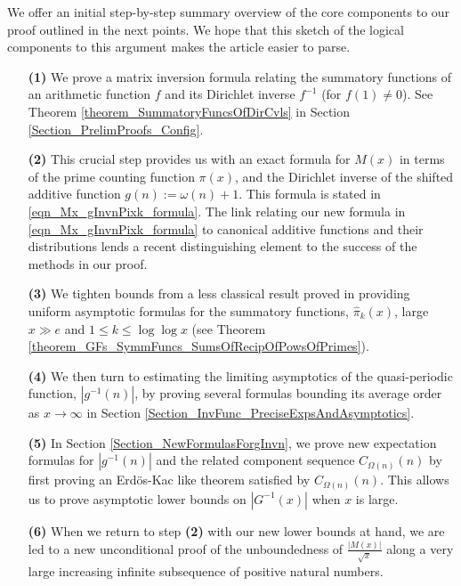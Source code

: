 \documentclass[11pt,reqno,a4letter]{article}
\numberwithin{figure}{section}
\numberwithin{table}{section}
\theoremstyle{plain}
\numberwithin{theorem}{section}
\theoremstyle{definition}
\begin{document}
We offer an initial step-by-step summary overview of the core components 
to our proof outlined in the next points. 
We hope that this sketch of the logical components 
to this argument makes the article easier to parse. 
\begin{itemize} 

\item[\textbf{(1)}] We prove a matrix inversion formula relating the summatory 
           functions of an arithmetic function $f$ and its Dirichlet inverse $f^{-1}$ (for $f(1) \neq 0$). 
           See Theorem \ref{theorem_SummatoryFuncsOfDirCvls} in 
           Section \ref{Section_PrelimProofs_Config}.  
\item[\textbf{(2)}] This crucial step provides us with an exact formula for $M(x)$ in terms of 
           the prime counting function $\pi(x)$, and the 
           Dirichlet inverse of the shifted additive function $g(n) := \omega(n) + 1$. This 
           formula is stated in \eqref{eqn_Mx_gInvnPixk_formula}. 
           The link relating our new formula in 
           \eqref{eqn_Mx_gInvnPixk_formula} to canonical additive functions and their 
           distributions lends a recent distinguishing element to the 
           success of the methods in our proof. 
\item[\textbf{(3)}] We tighten bounds from a less classical result proved in 
            \cite[\S 7]{MV} providing uniform asymptotic formulas for the  
           summatory functions, $\widehat{\pi}_k(x)$, large $x \gg e$ and 
           $1 \leq k \leq \log\log x$ 
           (see Theorem \ref{theorem_GFs_SymmFuncs_SumsOfRecipOfPowsOfPrimes}). 
\item[\textbf{(4)}] We then turn to estimating the limiting 
           asymptotics of the quasi-periodic function, $|g^{-1}(n)|$, by proving several formulas bounding its 
           average order as $x \rightarrow \infty$ in 
           Section \ref{Section_InvFunc_PreciseExpsAndAsymptotics}. 
\item[\textbf{(5)}] In Section \ref{Section_NewFormulasForgInvn}, 
           we prove new expectation formulas for $|g^{-1}(n)|$ and the related component sequence 
           $C_{\Omega(n)}(n)$ by first proving an Erd\"os-Kac like theorem satisfied by $C_{\Omega(n)}(n)$. 
           This allows us to prove asymptotic lower bounds on $|G^{-1}(x)|$ when $x$ is large. 
\item[\textbf{(6)}] When we return to step \textbf{(2)} 
           with our new lower bounds at hand, we are led to a new unconditional proof of the 
           unboundedness of $\frac{|M(x)|}{\sqrt{x}}$ 
           along a very large increasing infinite subsequence of positive natural numbers. 
           
\end{itemize} 
\end{document}
